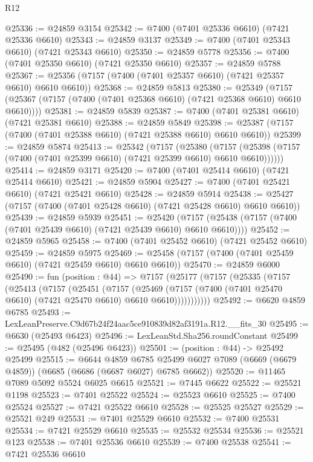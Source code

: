 \begin{lexlean}{R12}
\begin{coremodule}
@25336 := @24859 @3154
@25342 := @7400 (@7401 @25336 @6610) (@7421 @25336 @6610)
@25343 := @24859 @3137
@25349 := @7400 (@7401 @25343 @6610) (@7421 @25343 @6610)
@25350 := @24859 @5778
@25356 := @7400 (@7401 @25350 @6610) (@7421 @25350 @6610)
@25357 := @24859 @5788
@25367 := @25356 (@7157 (@7400 (@7401 @25357 @6610) (@7421 @25357 @6610) @6610 @6610))
@25368 := @24859 @5813
@25380 := @25349
    (@7157 (@25367 (@7157 (@7400 (@7401 @25368 @6610) (@7421 @25368 @6610) @6610 @6610))))
@25381 := @24859 @5839
@25387 := @7400 (@7401 @25381 @6610) (@7421 @25381 @6610)
@25388 := @24859 @5849
@25398 := @25387 (@7157 (@7400 (@7401 @25388 @6610) (@7421 @25388 @6610) @6610 @6610))
@25399 := @24859 @5874
@25413 := @25342
    (@7157
      (@25380
        (@7157 (@25398 (@7157 (@7400 (@7401 @25399 @6610) (@7421 @25399 @6610) @6610 @6610))))))
@25414 := @24859 @3171
@25420 := @7400 (@7401 @25414 @6610) (@7421 @25414 @6610)
@25421 := @24859 @5904
@25427 := @7400 (@7401 @25421 @6610) (@7421 @25421 @6610)
@25428 := @24859 @5914
@25438 := @25427 (@7157 (@7400 (@7401 @25428 @6610) (@7421 @25428 @6610) @6610 @6610))
@25439 := @24859 @5939
@25451 := @25420
    (@7157 (@25438 (@7157 (@7400 (@7401 @25439 @6610) (@7421 @25439 @6610) @6610 @6610))))
@25452 := @24859 @5965
@25458 := @7400 (@7401 @25452 @6610) (@7421 @25452 @6610)
@25459 := @24859 @5975
@25469 := @25458 (@7157 (@7400 (@7401 @25459 @6610) (@7421 @25459 @6610) @6610 @6610))
@25470 := @24859 @6000
@25490 := fun (position : @44) =>
  @7157
    (@25177
      (@7157
        (@25335
          (@7157
            (@25413
              (@7157
                (@25451
                  (@7157
                    (@25469
                      (@7157 (@7400 (@7401 @25470 @6610) (@7421 @25470 @6610) @6610 @6610)))))))))))
@25492 := @6620 @4859 @6785
@25493 := LexLeanPreserve.C9d67b24f24aac5ce910839d82af3191a.R12.__fits_30
@25495 := @6630 (@25493 @6423)
@25496 := LexLeanStd.Sha256.roundConstant
@25499 := @25495 (@482 (@25496 @6423))
@25501 := (position : @44) -> @25492 @25499
@25515 := @6644
    @4859
    @6785
    @25499
    @6027
    @7089
    (@6669 (@6679 @4859))
    (@6685 (@6686 (@6687 @6027) @6785 @6662))
@25520 := @11465 @7089 @5092 @5524 @6025 @6615
@25521 := @7445 @6622
@25522 := @25521 @1198
@25523 := @7401 @25522
@25524 := @25523 @6610
@25525 := @7400 @25524
@25527 := @7421 @25522 @6610
@25528 := @25525 @25527
@25529 := @25521 @249
@25531 := @7401 @25529 @6610
@25532 := @7400 @25531
@25534 := @7421 @25529 @6610
@25535 := @25532 @25534
@25536 := @25521 @123
@25538 := @7401 @25536 @6610
@25539 := @7400 @25538
@25541 := @7421 @25536 @6610

\end{coremodule}
\end{lexlean}
